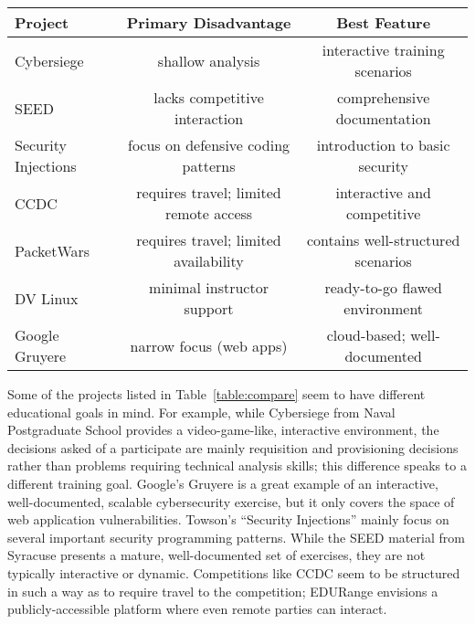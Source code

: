     \begin{table*}[ht]
    \caption{{\em A Summary Comparison of EDURange and Existing Projects.}
      EDURange focuses on developing analytical skills and understanding
      system and network failure modes. The table below is not a criticism
      of existing efforts, but meant to highlight the ways in which our
      plans for EDURange differ from the characteristics of existing
      projects -- these projects may have been built with different
      criteria in mind.}
    \begin{center}
    \begin{tabular}{|l||c|c|}
    \hline
    {\bf Project} & {\bf Primary Disadvantage} & {\bf Best Feature} \\
    \hline
     Cybersiege & shallow analysis
                & interactive training scenarios\\
    \hline
     SEED & lacks competitive interaction
          & comprehensive documentation\\
    \hline
     Security Injections & focus on defensive coding patterns
                         & introduction to basic security\\
    \hline
     CCDC & requires travel; limited remote access
          & interactive and competitive\\
    \hline
     PacketWars & requires travel; limited availability
                & contains well-structured scenarios\\
    \hline
     DV Linux & minimal instructor support
              & ready-to-go flawed environment\\
    \hline
     Google Gruyere & narrow focus (web apps)
                    & cloud-based; well-documented\\
    \hline
    \end{tabular}
    \end{center}
    \label{table:compare}
    \end{table*}



Some of the projects listed in Table~\ref{table:compare} seem to have
different educational goals in mind.  For example, while Cybersiege
from Naval Postgraduate School provides a video-game-like, interactive
environment, the decisions asked of a participate are mainly
requisition and provisioning decisions rather than problems requiring
technical analysis skills; this difference speaks to a different
training goal.  Google's Gruyere is a great example of an interactive,
well-documented, scalable cybersecurity exercise, but it only covers
the space of web application vulnerabilities.  Towson's ``Security
Injections'' mainly focus on several important security programming
patterns.  While the SEED material from Syracuse presents a mature,
well-documented set of exercises, they are not typically interactive
or dynamic.  Competitions like CCDC seem to be structured in such a
way as to require travel to the competition; EDURange envisions a
publicly-accessible platform where even remote parties can interact.

